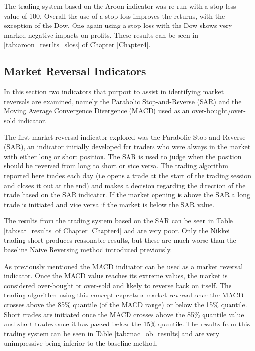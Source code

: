 

The trading system based on the Aroon indicator was re-run with a stop loss value of 100. Overall the use of a stop loss improves the returns, with the exception of the Dow. One again using a stop loss with the Dow shows very marked negative impacts on profits. These results can be seen in \ref{tab:aroon_results_sloss} of Chapter \ref{Chapter4}.

\subsection{Market Reversal Indicators}
In this section two indicators that purport to assist in identifying market reversals are examined, namely the Parabolic Stop-and-Reverse (SAR) and the Moving Average Convergence Divergence (MACD) used as an over-bought/over-sold indicator. 

The first market reversal indicator explored was the Parabolic Stop-and-Reverse (SAR), an indicator initially developed for traders who were always in the market with either long or short position. The SAR is used to judge when the  position should be reversed from long to short or vice versa. The trading algorithm reported here trades each day (i.e opens a trade at the start of the trading session and closes it out at the end) and makes a decision regarding the direction of the trade based on the SAR indicator. If the market opening is above the SAR a long trade is initiated and vice versa if the market is below the SAR value.

The results from the trading system based on the SAR can be seen in Table \ref{tab:sar_results} of Chapter \ref{Chapter4} and are very poor. Only the Nikkei trading short produces reasonable results, but these are much worse than the baseline Naive Reversing method introduced previously.

As previously mentioned the MACD indicator can be used as a market reversal indicator. Once the MACD value reaches its extreme values, the market is considered over-bought or over-sold and likely to reverse back on itself. The trading algorithm using this concept expects a market reversal once the MACD crosses above the 85\% quantile (of the MACD range) or below the 15\% quantile. Short trades are initiated once the MACD crosses above the 85\% quantile value and short trades once it has passed below the 15\% quantile. The results from this trading system can be seen in Table \ref{tab:mac_ob_results} and are very unimpressive being inferior to the baseline method.

